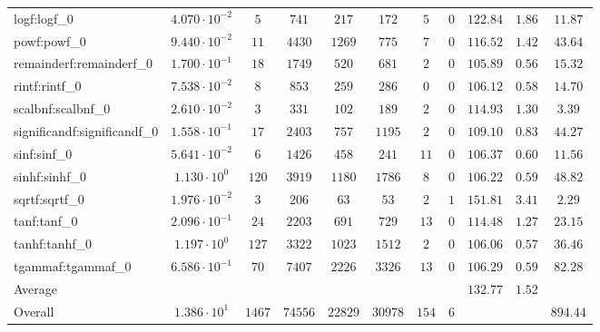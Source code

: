 \begin{tabular}{|l|c|c|c|c|c|c|c|c|c|c|}
logf:logf\_0                 & $ 4.070 \cdot 10^{-2} $ & $ 5      $ & $ 741   $ & $ 217   $ & $ 172   $ & $ 5   $ & $ 0 $ & $ 122.84      $ & $ 1.86    $ & $ 11.87   $ \\
powf:powf\_0                 & $ 9.440 \cdot 10^{-2} $ & $ 11     $ & $ 4430  $ & $ 1269  $ & $ 775   $ & $ 7   $ & $ 0 $ & $ 116.52      $ & $ 1.42    $ & $ 43.64   $ \\
remainderf:remainderf\_0     & $ 1.700 \cdot 10^{-1} $ & $ 18     $ & $ 1749  $ & $ 520   $ & $ 681   $ & $ 2   $ & $ 0 $ & $ 105.89      $ & $ 0.56    $ & $ 15.32   $ \\
rintf:rintf\_0               & $ 7.538 \cdot 10^{-2} $ & $ 8      $ & $ 853   $ & $ 259   $ & $ 286   $ & $ 0   $ & $ 0 $ & $ 106.12      $ & $ 0.58    $ & $ 14.70   $ \\
scalbnf:scalbnf\_0           & $ 2.610 \cdot 10^{-2} $ & $ 3      $ & $ 331   $ & $ 102   $ & $ 189   $ & $ 2   $ & $ 0 $ & $ 114.93      $ & $ 1.30    $ & $ 3.39    $ \\
significandf:significandf\_0 & $ 1.558 \cdot 10^{-1} $ & $ 17     $ & $ 2403  $ & $ 757   $ & $ 1195  $ & $ 2   $ & $ 0 $ & $ 109.10      $ & $ 0.83    $ & $ 44.27   $ \\
sinf:sinf\_0                 & $ 5.641 \cdot 10^{-2} $ & $ 6      $ & $ 1426  $ & $ 458   $ & $ 241   $ & $ 11  $ & $ 0 $ & $ 106.37      $ & $ 0.60    $ & $ 11.56   $ \\
sinhf:sinhf\_0               & $ 1.130 \cdot 10^{0}  $ & $ 120    $ & $ 3919  $ & $ 1180  $ & $ 1786  $ & $ 8   $ & $ 0 $ & $ 106.22      $ & $ 0.59    $ & $ 48.82   $ \\
sqrtf:sqrtf\_0               & $ 1.976 \cdot 10^{-2} $ & $ 3      $ & $ 206   $ & $ 63    $ & $ 53    $ & $ 2   $ & $ 1 $ & $ 151.81      $ & $ 3.41    $ & $ 2.29    $ \\
tanf:tanf\_0                 & $ 2.096 \cdot 10^{-1} $ & $ 24     $ & $ 2203  $ & $ 691   $ & $ 729   $ & $ 13  $ & $ 0 $ & $ 114.48      $ & $ 1.27    $ & $ 23.15   $ \\
tanhf:tanhf\_0               & $ 1.197 \cdot 10^{0}  $ & $ 127    $ & $ 3322  $ & $ 1023  $ & $ 1512  $ & $ 2   $ & $ 0 $ & $ 106.06      $ & $ 0.57    $ & $ 36.46   $ \\
tgammaf:tgammaf\_0           & $ 6.586 \cdot 10^{-1} $ & $ 70     $ & $ 7407  $ & $ 2226  $ & $ 3326  $ & $ 13  $ & $ 0 $ & $ 106.29      $ & $ 0.59    $ & $ 82.28   $ \\
\hline
Average                      & $                     $ & $        $ & $       $ & $       $ & $       $ & $     $ & $   $ & $ 132.77      $ & $ 1.52    $ & $         $ \\
\hline
Overall                      & $ 1.386 \cdot 10^{1}  $ & $ 1467   $ & $ 74556 $ & $ 22829 $ & $ 30978 $ & $ 154 $ & $ 6 $ & $             $ & $         $ & $ 894.44  $ \\
\hline
\end{tabular}
